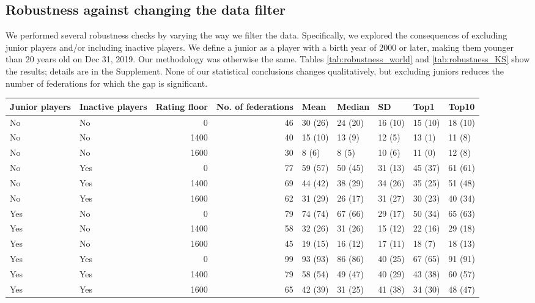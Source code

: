 \documentclass[9pt,twocolumn,twoside,lineno]{pnas-new}
\begin{document}
\subsection*{Robustness against changing the data filter}
We performed several robustness checks by varying the way we filter the data. Specifically, we explored the consequences of excluding junior players and/or including inactive players. We define a junior as a player with a birth year of 2000 or later, making them younger than 20 years old on Dec 31, 2019. Our methodology was otherwise the same. Tables \ref{tab:robustness_world} and \ref{tab:robustness_KS} show the results; details are in the Supplement. None of our statistical conclusions changes qualitatively, but excluding juniors reduces the number of federations for which the gap is significant.

\begin{table}[t!]
\centering
\begin{tabular}{l|l|r|r|l|l|l|l|l}
\hline
Junior players & Inactive players & Rating floor & No. of federations & Mean & Median & SD & Top1 & Top10\\
\hline
No & No & 0 & 46 & 30 (26) & 24 (20) & 16 (10) & 15 (10) & 18 (10)\\
No & No & 1400 & 40 & 15 (10) & 13 (9) & 12 (5) & 13 (1) & 11 (8)\\
No & No & 1600 & 30 & 8 (6) & 8 (5) & 10 (6) & 11 (0) & 12 (8)\\
\hline
No & Yes & 0 & 77 & 59 (57) & 50 (45) & 31 (13) & 45 (37) & 61 (61)\\
No & Yes & 1400 & 69 & 44 (42) & 38 (29) & 34 (26) & 35 (25) & 51 (48)\\
No & Yes & 1600 & 62 & 31 (29) & 26 (17) & 31 (27) & 30 (23) & 40 (34)\\
\hline
Yes & No & 0 & 79 & 74 (74) & 67 (66) & 29 (17) & 50 (34) & 65 (63)\\
Yes & No & 1400 & 58 & 32 (26) & 31 (26) & 15 (12) & 22 (16) & 29 (18)\\
Yes & No & 1600 & 45 & 19 (15) & 16 (12) & 17 (11) & 18 (7) & 18 (13)\\
\hline
Yes & Yes & 0 & 99 & 93 (93) & 86 (86) & 40 (25) & 67 (65) & 91 (91)\\
Yes & Yes & 1400 & 79 & 58 (54) & 49 (47) & 40 (29) & 43 (38) & 60 (57)\\
Yes & Yes & 1600 & 65 & 42 (39) & 31 (25) & 41 (38) & 34 (30) & 48 (47)\\
\hline
\end{tabular}


\end{table}
\end{document}

